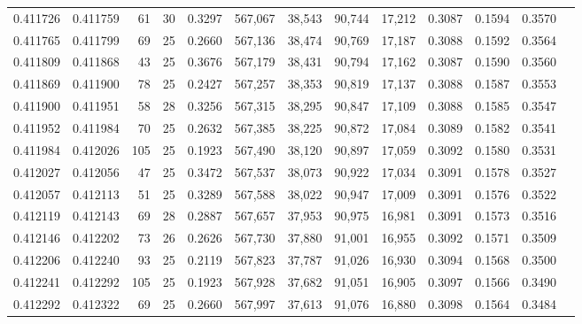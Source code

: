 \begin{tabular}{rrrrrrrrrrrrr}
0.411726 & 0.411759 &    61 &  30 &                                     0.3297 & 567,067 &  38,543 &  90,744 &  17,212 & 0.3087 & 0.1594 & 0.3570 \\
0.411765 & 0.411799 &    69 &  25 &                                     0.2660 & 567,136 &  38,474 &  90,769 &  17,187 & 0.3088 & 0.1592 & 0.3564 \\
0.411809 & 0.411868 &    43 &  25 &                                     0.3676 & 567,179 &  38,431 &  90,794 &  17,162 & 0.3087 & 0.1590 & 0.3560 \\
0.411869 & 0.411900 &    78 &  25 &                                     0.2427 & 567,257 &  38,353 &  90,819 &  17,137 & 0.3088 & 0.1587 & 0.3553 \\
0.411900 & 0.411951 &    58 &  28 &                                     0.3256 & 567,315 &  38,295 &  90,847 &  17,109 & 0.3088 & 0.1585 & 0.3547 \\
0.411952 & 0.411984 &    70 &  25 &                                     0.2632 & 567,385 &  38,225 &  90,872 &  17,084 & 0.3089 & 0.1582 & 0.3541 \\
0.411984 & 0.412026 &   105 &  25 &                                     0.1923 & 567,490 &  38,120 &  90,897 &  17,059 & 0.3092 & 0.1580 & 0.3531 \\
0.412027 & 0.412056 &    47 &  25 &                                     0.3472 & 567,537 &  38,073 &  90,922 &  17,034 & 0.3091 & 0.1578 & 0.3527 \\
0.412057 & 0.412113 &    51 &  25 &                                     0.3289 & 567,588 &  38,022 &  90,947 &  17,009 & 0.3091 & 0.1576 & 0.3522 \\
0.412119 & 0.412143 &    69 &  28 &                                     0.2887 & 567,657 &  37,953 &  90,975 &  16,981 & 0.3091 & 0.1573 & 0.3516 \\
0.412146 & 0.412202 &    73 &  26 &                                     0.2626 & 567,730 &  37,880 &  91,001 &  16,955 & 0.3092 & 0.1571 & 0.3509 \\
0.412206 & 0.412240 &    93 &  25 &                                     0.2119 & 567,823 &  37,787 &  91,026 &  16,930 & 0.3094 & 0.1568 & 0.3500 \\
0.412241 & 0.412292 &   105 &  25 &                                     0.1923 & 567,928 &  37,682 &  91,051 &  16,905 & 0.3097 & 0.1566 & 0.3490 \\
0.412292 & 0.412322 &    69 &  25 &                                     0.2660 & 567,997 &  37,613 &  91,076 &  16,880 & 0.3098 & 0.1564 & 0.3484 \\

\end{tabular}
